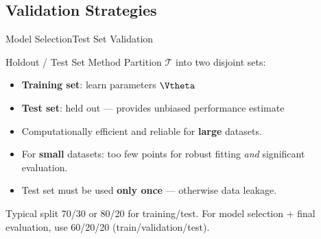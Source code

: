 \subsection{Validation Strategies}

\begin{frame}{Model Selection}{Test Set Validation}
  \begin{block}{Holdout / Test Set Method}
    Partition $\mathcal{T}$ into two disjoint sets:
    \begin{itemize}
      \item \textbf{Training set}: learn parameters $\Vtheta$
      \item \textbf{Test set}: held out — provides unbiased performance estimate
    \end{itemize}
  \end{block}

  \begin{itemize}
    \item Computationally efficient and reliable for \textbf{large} datasets.
    \item For \textbf{small} datasets: too few points for robust fitting \emph{and} significant evaluation.
    \item Test set must be used \textbf{only once} — otherwise data leakage.
  \end{itemize}

  \begin{exampleblock}{Typical split}
    70/30 or 80/20 for training/test. For model selection + final evaluation, use 60/20/20 (train/validation/test).
  \end{exampleblock}
\end{frame}


